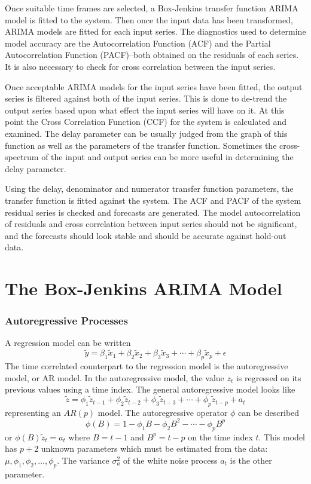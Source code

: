 \documentclass[12pt]{report}
\begin{document}
Once suitable time frames are selected, a Box-Jenkins transfer
function ARIMA model is fitted to the system.  Then once the input
data has been transformed, ARIMA models are fitted for each input
series. The diagnostics used to determine model accuracy are the
Autocorrelation Function (ACF) and the Partial Autocorrelation
Function (PACF)--both obtained on the residuals of each series. It
is also necessary to check for cross correlation between the input
series.

Once acceptable ARIMA models for the input series have been
fitted, the output series is filtered against both of the input
series. This is done to de-trend the output series based upon what
effect the input series will have on it. At this point the Cross
Correlation Function (CCF) for the system is calculated and
examined.  The delay parameter can be usually judged from the
graph of this function as well as the parameters of the transfer
function. Sometimes the cross-spectrum of the input and output
series can be more useful in determining the delay parameter.

Using the delay, denominator and numerator transfer function
parameters, the transfer function is fitted against the system.
The ACF and PACF of the system residual series is checked and
forecasts are generated. The model autocorrelation of residuals
and cross correlation between input series should not be
significant, and the forecasts should look stable and should be
accurate against hold-out data.

\section{The Box-Jenkins ARIMA Model}
\subsubsection{Autoregressive Processes} A regression model can be
written
\begin{equation}
\tilde{y}=\beta_{1}\tilde{x}_{1}+\beta_{2}\tilde{x}_{2}+\beta_{3}\tilde{x}_{3}+\cdots+\beta_{p}\tilde{x}_{p}+\epsilon
\end{equation}
The time correlated counterpart to the regression model is the
autoregressive model, or AR model.  In the autoregressive model,
the value $z_{t}$ is regressed on its previous values using a time
index.  The general autoregressive model looks like
\begin{equation}
\tilde{z}=\phi_{1}\tilde{z}_{t-1}+\phi_{2}\tilde{z}_{t-2}+\phi_{3}\tilde{z}_{t-3}+\cdots+\phi_{p}\tilde{z}_{t-p}+a_{t}
\end{equation}
representing an $AR(p)$ model.  The autoregressive operator $\phi$
can be described
\begin{equation}\phi(B)=1-\phi_{1}B-\phi_{2}B^{2}-\cdots-\phi_{p}B^{p}\end{equation}
or $\phi(B)\tilde{z}_{t}=a_{t}$ where $B=t-1$ and $B^{p}=t-p$ on
the time index $t$.  This model has $p+2$ unknown parameters which
must be estimated from the data:
$\mu,\phi_{1},\phi_{2},\dots,\phi_{p}$.  The variance
$\sigma_{a}^{2}$ of the white noise process $a_{t}$ is the other
parameter.
\end{document}
